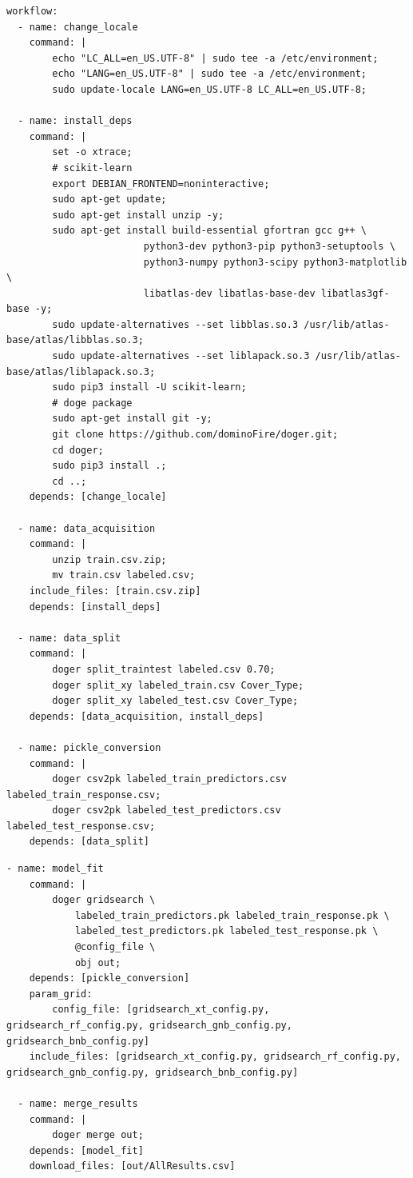 \begin{lstlisting}[label={code:forests_1},caption={Flujo de trabajo para búsqueda de parámetros (parte 1).},float]
workflow:
  - name: change_locale
    command: |
        echo "LC_ALL=en_US.UTF-8" | sudo tee -a /etc/environment;
        echo "LANG=en_US.UTF-8" | sudo tee -a /etc/environment;
        sudo update-locale LANG=en_US.UTF-8 LC_ALL=en_US.UTF-8;

  - name: install_deps
    command: |
        set -o xtrace;
        # scikit-learn
        export DEBIAN_FRONTEND=noninteractive;
        sudo apt-get update;
        sudo apt-get install unzip -y;
        sudo apt-get install build-essential gfortran gcc g++ \
                        python3-dev python3-pip python3-setuptools \
                        python3-numpy python3-scipy python3-matplotlib \
                        libatlas-dev libatlas-base-dev libatlas3gf-base -y;
        sudo update-alternatives --set libblas.so.3 /usr/lib/atlas-base/atlas/libblas.so.3;
        sudo update-alternatives --set liblapack.so.3 /usr/lib/atlas-base/atlas/liblapack.so.3;
        sudo pip3 install -U scikit-learn;
        # doge package
        sudo apt-get install git -y;
        git clone https://github.com/dominoFire/doger.git;
        cd doger;
        sudo pip3 install .;
        cd ..;
    depends: [change_locale]

  - name: data_acquisition
    command: |
        unzip train.csv.zip;
        mv train.csv labeled.csv;
    include_files: [train.csv.zip]
    depends: [install_deps]

  - name: data_split
    command: |
        doger split_traintest labeled.csv 0.70;
        doger split_xy labeled_train.csv Cover_Type;
        doger split_xy labeled_test.csv Cover_Type;
    depends: [data_acquisition, install_deps]

  - name: pickle_conversion
    command: |
        doger csv2pk labeled_train_predictors.csv labeled_train_response.csv;
        doger csv2pk labeled_test_predictors.csv labeled_test_response.csv;
    depends: [data_split]
\end{lstlisting}

\begin{lstlisting}[label={code:forests_2},caption={Flujo de trabajo para búsqueda de parámetros (parte 2).},float]
  - name: model_fit
    command: |
        doger gridsearch \
            labeled_train_predictors.pk labeled_train_response.pk \
            labeled_test_predictors.pk labeled_test_response.pk \
            @config_file \
            obj out;
    depends: [pickle_conversion]
    param_grid:
        config_file: [gridsearch_xt_config.py, gridsearch_rf_config.py, gridsearch_gnb_config.py, gridsearch_bnb_config.py]
    include_files: [gridsearch_xt_config.py, gridsearch_rf_config.py, gridsearch_gnb_config.py, gridsearch_bnb_config.py]

  - name: merge_results
    command: |
        doger merge out;
    depends: [model_fit]
    download_files: [out/AllResults.csv]
\end{lstlisting}


